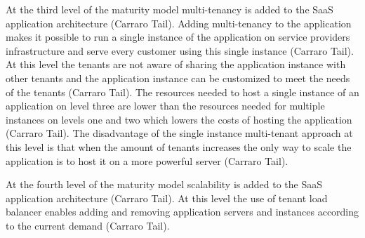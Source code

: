\documentclass[conference]{sasmoota2017}
\begin{document}
At the third level of the maturity model multi-tenancy is added to the SaaS application architecture (Carraro Tail). Adding multi-tenancy to the application makes it possible to run a single instance of the application on service providers infrastructure and serve every customer using this single instance (Carraro Tail). At this level the tenants are not aware of sharing the application instance with other tenants and the application instance can be customized to meet the needs of the tenants (Carraro Tail). The resources needed to host a single instance of an application on level three are lower than the resources needed for multiple instances on levels one and two which lowers the costs of hosting the application (Carraro Tail). The disadvantage of the single instance multi-tenant approach at this level is that when the amount of tenants increases the only way to scale the application is to host it on a more powerful server (Carraro Tail). 

At the fourth level of the maturity model scalability is added to the SaaS application architecture (Carraro Tail). At this level the use of tenant load balancer enables adding and removing application servers and instances according to the current demand (Carraro Tail).
\end{document}
